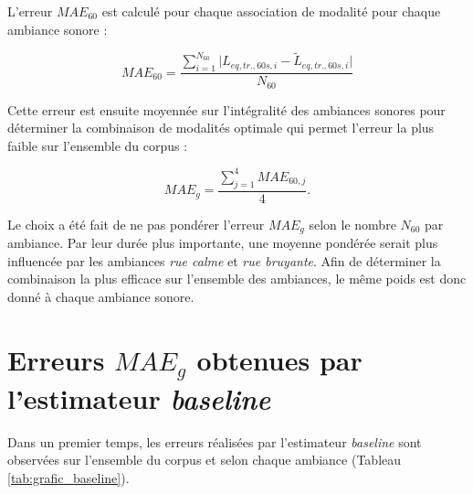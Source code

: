 L'erreur $MAE_{60}$ est calculé pour chaque association de modalité pour chaque ambiance sonore : 

\begin{equation}
MAE_{60} = \frac{\sum_{i = 1}^{N_{60}}\vert L_{eq,tr.,60s, i} - \tilde{L}_{eq,tr.,60s, i}\vert}{N_{60}}
\end{equation}

Cette erreur est ensuite moyennée sur l'intégralité des ambiances sonores pour déterminer la combinaison de modalités optimale qui permet l'erreur la plus faible sur l'ensemble du corpus :
  
\begin{equation}
MAE_{g} = \frac{\sum_{j = 1}^4 MAE_{60,j}}{4}.
\end{equation}

Le choix a été fait de ne pas pondérer l'erreur $MAE_{g}$ selon le nombre $N_{60}$ par ambiance. Par leur durée plus importante, une moyenne pondérée serait plus influencée par les ambiances \textit{rue calme} et \textit{rue bruyante}. Afin de déterminer la combinaison la plus efficace sur l'ensemble des ambiances, le même poids est donc donné à chaque ambiance sonore.



\section{Erreurs $MAE_g$ obtenues par l'estimateur \textit{baseline}}
Dans un premier temps, les erreurs réalisées par l'estimateur \textit{baseline} sont observées sur l'ensemble du corpus et selon chaque ambiance (Tableau \ref{tab:grafic_baseline}).


